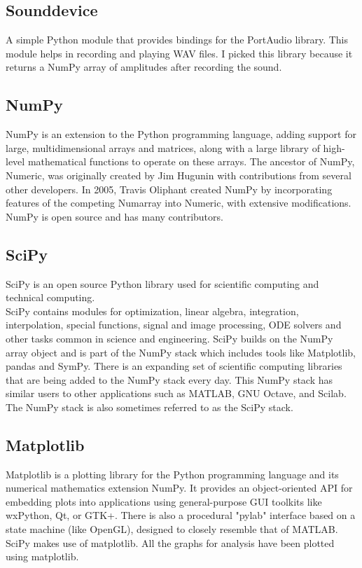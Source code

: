 \documentclass[12pt]{article}
\begin{document}
		\subsection{Sounddevice}
		A simple Python module that provides bindings for the PortAudio library. This module helps in recording and playing WAV files. I picked this library because it returns a NumPy array of amplitudes after recording the sound.
		
		\subsection{NumPy}
		NumPy is an extension to the Python programming language, adding support for large, multidimensional arrays and matrices, along with a large library of high-level mathematical functions to operate on these arrays. The ancestor of NumPy, Numeric, was originally created by Jim Hugunin with contributions from several other developers. In 2005, Travis Oliphant created NumPy by incorporating features of the competing Numarray into Numeric, with extensive modifications. NumPy is open source and has many contributors.
		
		\subsection{SciPy}
		SciPy is an open source Python library used for scientific computing and technical computing.
		\\SciPy contains modules for optimization, linear algebra, integration, interpolation, special functions, signal and image processing, ODE solvers and other tasks common in science and engineering.
		SciPy builds on the NumPy array object and is part of the NumPy stack which includes tools like Matplotlib, pandas and SymPy. There is an expanding set of scientific computing libraries that are being added to the NumPy stack every day. This NumPy stack has similar users to other applications such as MATLAB, GNU Octave, and Scilab. The NumPy stack is also sometimes referred to as the SciPy stack.
		
		\subsection{Matplotlib}
		Matplotlib is a plotting library for the Python programming language and its numerical mathematics extension NumPy. It provides an object-oriented API for embedding plots into applications using general-purpose GUI toolkits like wxPython, Qt, or GTK+. There is also a procedural "pylab" interface based on a state machine (like OpenGL), designed to closely resemble that of MATLAB. SciPy makes use of matplotlib. All the graphs for analysis have been plotted using matplotlib.
		
\end{document}
